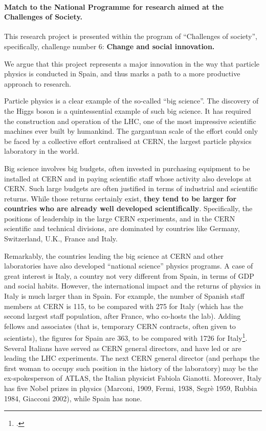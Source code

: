 \paragraph{Match to the National Programme for research aimed at the Challenges of Society.}
This research project is presented within the program of ``Challenges of society'', specifically, challenge number 6: {\bf Change and social innovation.}

We argue that this project represents a major innovation in the way that particle physics is conducted in Spain, and thus marks a path to a more productive approach to research.

Particle physics is a clear example of the so-called ``big science''. The discovery of the Higgs boson is a quintessential example of such big science. It has required the construction and operation of the LHC, one of the most impressive scientific machines ever built by humankind. The gargantuan scale of the effort could only be faced by a collective effort centralised at CERN, the largest particle physics laboratory in the world.  

Big science involves big budgets, often invested in purchasing equipment to be installed at CERN and in paying scientific staff whose activity also develops at CERN. Such large budgets are often justified in terms of industrial and scientific returns. While those returns certainly exist, {\bf they tend to be larger for countries who are already well developed scientifically}. Specifically, the positions of leadership in the large CERN experiments, and in the CERN scientific and technical divisions, are dominated by countries like Germany, Switzerland, U.K., France and Italy. 

Remarkably, the countries leading the big science at CERN and other laboratories have also developed ``national science'' physics programs. A case of great interest is Italy, a country not very different from Spain, in terms of GDP and social habits. However, the international impact and the returns of physics in Italy is much larger than in Spain. For example, the number of Spanish staff members at CERN is 115, to be compared with 275 for Italy (which has the second largest staff population, after France, who co-hosts the lab). Adding fellows and associates (that is, temporary CERN contracts, often given to scientists), the figures for Spain are 363, to be compared with 1726 for Italy\footcite{cernstats}. Several Italians have served as CERN general directors, and have led or are leading the LHC experiments. The next CERN general director (and perhaps the first woman to occupy such position in the history of the laboratory) may be the ex-spokesperson of ATLAS, the Italian physicist Fabiola Gianotti. Moreover, Italy has five Nobel prizes in physics (Marconi, 1909, Fermi, 1938, Segrè 1959, Rubbia 1984, Giacconi 2002), while Spain has none. 

